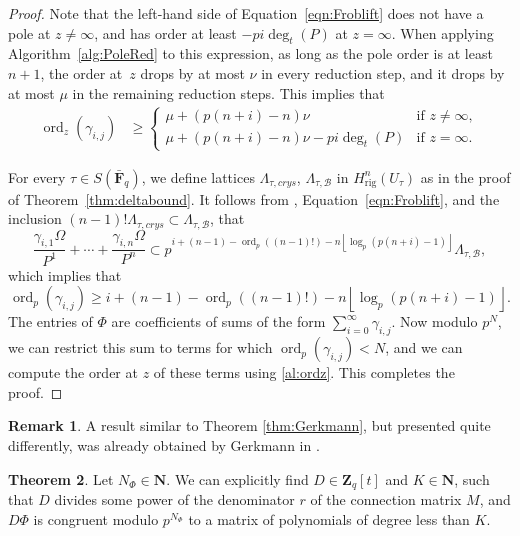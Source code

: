 \documentclass[a4paper,11pt]{article}
\numberwithin{equation}{section}
\providecommand{\floor}[1]{\left\lfloor#1\right\rfloor}   %
\newcommand{\NN}{\mathbf{N}} %
\newcommand{\ZZ}{\mathbf{Z}} %
\newcommand{\FF}{\mathbf{F}} %
\DeclareMathOperator{\ord}{ord}          %
\providecommand{\Hrig}{H_{\text{rig}}}  %
\providecommand{\cB}{\mathcal{B}} %
\theoremstyle{definition}
\newtheorem{thm}{Theorem}[section]
\newtheorem{rem}[thm]{Remark}
\begin{document}
\begin{proof}
Note that the left-hand side of Equation~\eqref{eqn:Froblift} does not have a 
pole at $z \neq \infty$, and has order at least $-pi\deg_t(P)$ at $z=\infty$. 
When applying Algorithm~\ref{alg:PoleRed} to this expression, as long as the 
pole order is at least~$n+1$, the order at~$z$ drops by at most $\nu$ in every 
reduction step, and it drops by at most $\mu$ in the remaining reduction steps. 
This implies that
\begin{align} \label{al:ordz}
\ord_z(\gamma_{i,j}) &\geq 
\begin{cases}
\mu + (p(n+i)-n) \nu                 &\mbox{if } z \neq \infty, \\
\mu + (p(n+i)-n) \nu - pi \deg_t(P)  &\mbox{if } z=\infty.
\end{cases}
\end{align}

For every $\tau \in S(\bar{\FF}_q)$, we
define lattices $\Lambda_{\tau,crys}$, $\Lambda_{\tau,\cB}$ in $\Hrig^n(U_{\tau})$
as in the proof of Theorem~\ref{thm:deltabound}. It follows from
\citep[Proposition 3.4.6]{AbbottKedlayaRoe2006}, Equation~\eqref{eqn:Froblift}, 
and the inclusion $(n-1)!\Lambda_{\tau,crys} \subset \Lambda_{\tau,\cB}$, that
\begin{equation*}
\frac{\gamma_{i,1} \Omega}{P^1}+\dotsb+\frac{\gamma_{i,n} \Omega}{P^n} \subset 
p^{i+(n-1)-\ord_p((n-1)!)-n \floor{\log_p(p(n+i)-1)}} \Lambda_{\tau,\cB},
\end{equation*}
which implies that
\begin{equation*}
\ord_p(\gamma_{i,j}) \geq i+(n-1) - \ord_p((n-1)!) - n \floor{\log_p(p(n+i)-1)}.
\end{equation*}
The entries of $\Phi$ are coefficients of sums of the form 
$\sum_{i=0}^{\infty} \gamma_{i,j}$. Now modulo $p^N$, we can 
restrict this sum to terms for which $\ord_p(\gamma_{i,j})<N$,
and we can compute the order at $z$ of these terms using
\eqref{al:ordz}. This completes the proof.
\end{proof}

\begin{rem}
A result similar to Theorem \ref{thm:Gerkmann}, but presented quite 
differently, was already obtained by Gerkmann in \citep[Section 6]{Gerkmann2007}.
\end{rem}

\begin{thm} \label{thm:defD}
Let $N_{\Phi} \in \NN$. We can explicitly find $D \in \ZZ_q[t]$ and
$K \in \NN$, such that $D$ divides some power of the denominator $r$ 
of the connection matrix $M$, and $D \Phi$ is congruent modulo $p^{N_{\Phi}}$ 
to a matrix of polynomials of degree less than $K$.
\end{thm}
\end{document}
